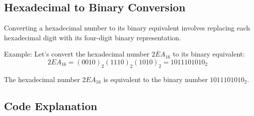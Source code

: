 \documentclass{article}
\begin{document}
\subsection{Hexadecimal to Binary Conversion}

Converting a hexadecimal number to its binary equivalent involves replacing each hexadecimal digit with its four-digit binary representation.

Example: Let's convert the hexadecimal number $2EA_{16}$ to its binary equivalent:
\[ 2EA_{16} = (0010)_2 (1110)_2 (1010)_2 = 1011101010_2 \]

The hexadecimal number $2EA_{16}$ is equivalent to the binary number $1011101010_2$.


\subsection{Code Explanation}
\end{document}
